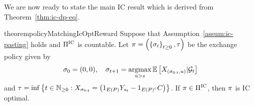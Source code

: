 We are now ready to state the main IC result which is derived from Theorem~\ref{thm:ic-dp-eq}.

\begin{restatable}{theorem}{policyMatchingIcOptReward}
    \label{thm:policy-matching-ic-opt-reward}
    Suppose that Assumption~\ref{assum:ic-pasting} holds and $\Pi^{\text{IC}}$ is countable.
    Let 
    \(
        \pi
        =
        \left(
            \left\{
                \sigma_{t}
            \right\}_{t\geq 0},
            \tau
        \right)
    \)
    be the exchange policy given by
    \begin{align*}
        \sigma_{0}=(0,0),
        \quad
        \sigma_{t+1}
        =
        \operatorname*{argmax}_{
            u>s
        }
        \mathbb{E}\left[
            X_{
                \left(
                    \sigma_{0:t},u
                \right)
            }
            | \mathcal{G}_{t}
        \right]
    \end{align*}  
    and
    \(
        \tau
        =
        \inf\left\{
            t\in\mathbb{N}_{\geq 0} :
            X_{
                \sigma_{0:t}
            }
            =
            \left(
                1_{
                    E\left(P\right)
                }
                Y_{s_{t}}
                -
                1_{
                    E\left(P\right)^c
                }
                C
            \right)
        \right\}
    \).
    If 
    $\pi\in\Pi^{\text{IC}}$,
    then $\pi$ is IC optimal. 
\end{restatable}  

